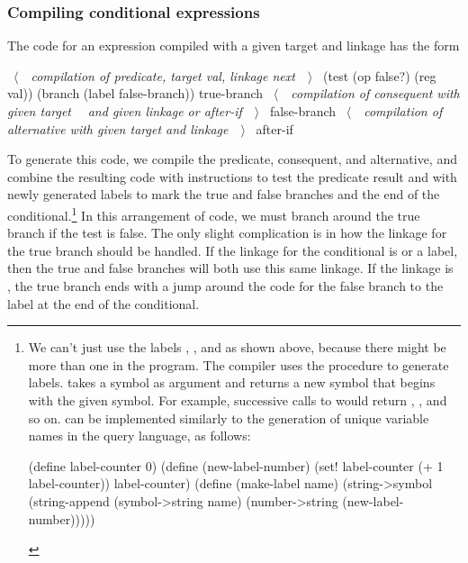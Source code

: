 \subsubsection*{Compiling conditional expressions}

The code for an  expression compiled with a given target and linkage
has the form

\begin{codeBlock}
~\(\langle \)~~\emph{compilation of predicate, target \emph{val}, linkage \emph{next}}~~\(\rangle \)~
 (test (op false?) (reg val))
 (branch (label false-branch))
true-branch
 ~\(\langle \)~~\emph{compilation of consequent with given target}~
  ~\emph{and given linkage or \emph{after-if}}~~\(\rangle \)~
false-branch
 ~\(\langle \)~~\emph{compilation of alternative with given target and linkage}~~\(\rangle \)~
after-if
\end{codeBlock}

\noindent
To generate this code, we compile the predicate, consequent, and alternative,
and combine the resulting code with instructions to test the predicate result
and with newly generated labels to mark the true and false branches and the end
of the conditional.\footnote{We can't just use the labels ,
, and  as shown above, because there might be
more than one  in the program.  The compiler uses the procedure
 to generate labels.   takes a symbol as
argument and returns a new symbol that begins with the given symbol.  For
example, successive calls to  would return ,
, and so on.   can be implemented similarly to the
generation of unique variable names in the query language, as follows:

\begin{compactCodeBlock}
(define label-counter 0)
(define (new-label-number)
  (set! label-counter
        (+ 1 label-counter))
  label-counter)
(define (make-label name)
  (string->symbol
    (string-append
      (symbol->string name)
      (number->string (new-label-number)))))
\end{compactCodeBlock}
} In this arrangement of code, we must branch around the true branch if the
test is false.  The only slight complication is in how the linkage for the true
branch should be handled.  If the linkage for the conditional is 
or a label, then the true and false branches will both use this same linkage.
If the linkage is , the true branch ends with a jump around the code
for the false branch to the label at the end of the conditional.


